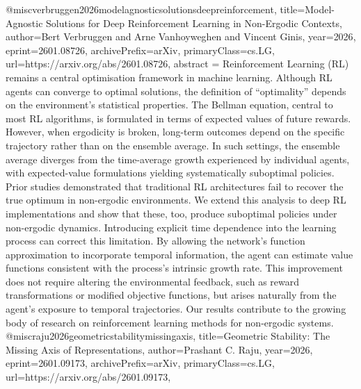 {}@misc{verbruggen2026modelagnosticsolutionsdeepreinforcement,
      title={Model-Agnostic Solutions for Deep Reinforcement Learning in Non-Ergodic Contexts}, 
      author={Bert Verbruggen and Arne Vanhoyweghen and Vincent Ginis},
      year={2026},
      eprint={2601.08726},
      archivePrefix={arXiv},
      primaryClass={cs.LG},
      url={https://arxiv.org/abs/2601.08726},
      abstract = {Reinforcement Learning (RL) remains a central optimisation framework in machine learning. Although RL agents can converge to optimal solutions, the definition of ``optimality'' depends on the environment's statistical properties. The Bellman equation, central to most RL algorithms, is formulated in terms of expected values of future rewards. However, when ergodicity is broken, long-term outcomes depend on the specific trajectory rather than on the ensemble average. In such settings, the ensemble average diverges from the time-average growth experienced by individual agents, with expected-value formulations yielding systematically suboptimal policies. Prior studies demonstrated that traditional RL architectures fail to recover the true optimum in non-ergodic environments. We extend this analysis to deep RL implementations and show that these, too, produce suboptimal policies under non-ergodic dynamics. Introducing explicit time dependence into the learning process can correct this limitation. By allowing the network's function approximation to incorporate temporal information, the agent can estimate value functions consistent with the process's intrinsic growth rate. This improvement does not require altering the environmental feedback, such as reward transformations or modified objective functions, but arises naturally from the agent's exposure to temporal trajectories. Our results contribute to the growing body of research on reinforcement learning methods for non-ergodic systems.}
}@misc{raju2026geometricstabilitymissingaxis,
      title={Geometric Stability: The Missing Axis of Representations}, 
      author={Prashant C. Raju},
      year={2026},
      eprint={2601.09173},
      archivePrefix={arXiv},
      primaryClass={cs.LG},
      url={https://arxiv.org/abs/2601.09173},
}
